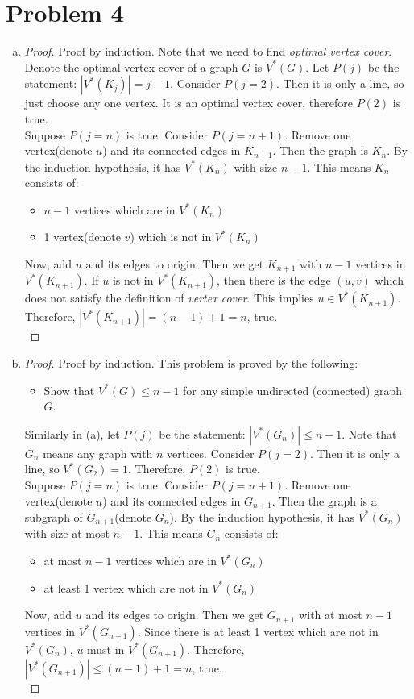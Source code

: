 \section*{Problem 4}
	\begin{enumerate} [(a)]
		\item \begin{proof}
			Proof by induction. Note that we need to find \textit{optimal vertex cover}. Denote the optimal vertex cover of a graph $G$ is $V^*(G)$. Let $P(j)$ be the statement: $\left|V^*(K_j)\right| = j - 1$. Consider $P(j=2)$. Then it is only a line, so just choose any one vertex. It is an optimal vertex cover, therefore $P(2)$ is true.\\
			Suppose $P(j=n)$ is true. Consider $P(j=n+1)$. Remove one vertex(denote $u$) and its connected edges in $K_{n+1}$. Then the graph is $K_n$. By the induction hypothesis, it has $V^*(K_n)$ with size $n-1$. This means $K_n$ consists of:
			\begin{itemize}
				\item $n-1$ vertices which are in $V^*(K_n)$
				\item 1 vertex(denote $v$) which is not in $V^*(K_n)$
			\end{itemize}
			Now, add $u$ and its edges to origin. Then we get $K_{n+1}$ with $n-1$ vertices in $V^*(K_{n+1})$. If $u$ is not in $V^*(K_{n+1})$, then there is the edge $(u, v)$ which does not satisfy the definition of \textit{vertex cover}. This implies $u\in V^*(K_{n+1})$. Therefore, $\left|V^*(K_{n+1})\right| = (n-1) + 1 = n$, true.\\
		\end{proof}
		\item \begin{proof}
			Proof by induction. This problem is proved by the following:
			\begin{itemize}
				\item [] Show that $V^*(G) \leq n-1$ for any simple undirected (connected) graph $G$.
			\end{itemize}
			Similarly in (a), let $P(j)$ be the statement: $\left|V^*(G_n)\right|\leq n-1$. Note that $G_n$ means any graph with $n$ vertices. Consider $P(j=2)$. Then it is only a line, so $V^*(G_2)=1$. Therefore, $P(2)$ is true.\\
			Suppose $P(j=n)$ is true. Consider $P(j=n+1)$. Remove one vertex(denote $u$) and its connected edges in $G_{n+1}$. Then the graph is a subgraph of $G_{n+1}$(denote $G_n$). By the induction hypothesis, it has $V^*(G_n)$ with size at most $n-1$. This means $G_n$ consists of:
			\begin{itemize}
				\item at most $n-1$ vertices which are in $V^*(G_n)$
				\item at least 1 vertex which are not in $V^*(G_n)$
			\end{itemize}
			Now, add $u$ and its edges to origin. Then we get $G_{n+1}$ with at most $n-1$ vertices in $V^*(G_{n+1})$. Since there is at least 1 vertex which are not in $V^*(G_n)$, $u$ must in $V^*(G_{n+1})$. Therefore, $\left|V^*(G_{n+1})\right| \leq (n-1) + 1 = n$, true.\\
		\end{proof}
	\end{enumerate}
